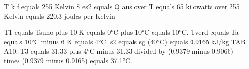 T k f equals 255 Kelvin
S es2 equals Q aus over T equals 65 kilowatts over 255 Kelvin equals 220.3 joules per Kelvin

T1 equals Tsuno plus 10 K equals 0°C plus 10°C equals 10°C. Tverd equals Ta equals 10°C minus 6 K equals 4°C. s2 equals sg (40°C) equals 0.9165 kJ/kg TAB A10. T3 equals 31.33 plus 4°C minus 31.33 divided by (0.9379 minus 0.9066) times (0.9379 minus 0.9165) equals 37.1°C.